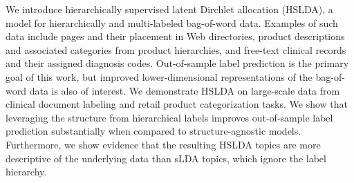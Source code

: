 We introduce hierarchically supervised latent Dirchlet allocation (HSLDA), a
model for hierarchically and multi-labeled bag-of-word data.  Examples of
such data include pages and their placement in Web directories, product
descriptions and associated categories from product hierarchies, and free-text
clinical records and their assigned diagnosis codes. Out-of-sample label
prediction is the primary goal of this work, but improved lower-dimensional
representations of the bag-of-word data is also of interest.
We demonstrate HSLDA on large-scale data from clinical document labeling and
retail product categorization tasks. We show that leveraging the structure from
hierarchical labels improves out-of-sample label prediction substantially when
compared to structure-agnostic models. Furthermore, we show evidence
that the resulting HSLDA topics are more descriptive of the underlying data
than sLDA topics, which ignore the label hierarchy.


